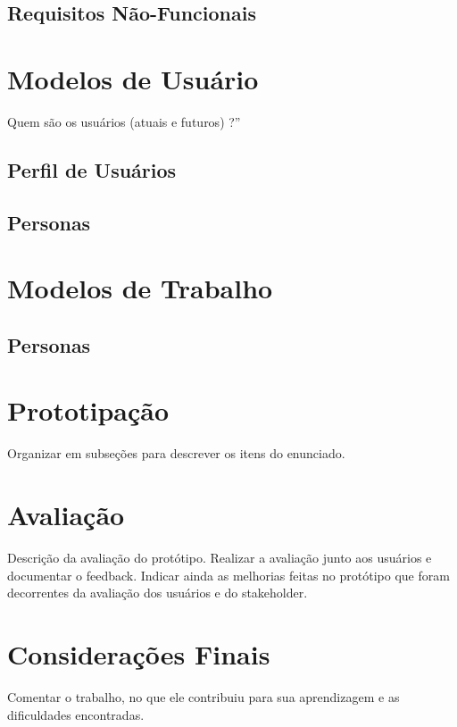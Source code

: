 \documentclass[12pt,brazil,a4paper]{article}
\begin{document}
\subsection{Requisitos Não-Funcionais}
\section{Modelos de Usuário}
\begin{description}
Quem são os usuários (atuais e futuros) ?” 
\end{description}
\subsection{Perfil de Usuários}
\subsection{Personas}
\section{Modelos de Trabalho}
\begin{description}
\subsection{Personas}

\end{description}
\section{Prototipação}
\begin{description}
Organizar em subseções para descrever os itens do enunciado.
\end{description}
\section{Avaliação}
\begin{description}
Descrição da avaliação do protótipo. Realizar a avaliação junto aos usuários e documentar o feedback. Indicar ainda as melhorias feitas no protótipo que foram decorrentes da avaliação dos usuários e do stakeholder.
\end{description}
\section{Considerações Finais}
\begin{description}
Comentar o trabalho, no que ele contribuiu para sua aprendizagem e as dificuldades encontradas.
\end{description}
\end{document}
